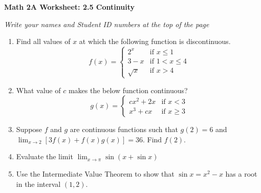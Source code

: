 \documentclass[12pt,fleqn]{article}
\begin{document}
\begin{center}
	\textbf{Math 2A Worksheet: 2.5 Continuity}
\end{center}

\emph{Write your names and Student ID numbers at the top of the page}


\begin{enumerate}
\item Find all values of $x$ at which the following function is discontinuous.
\[ f(x)=\begin{cases} 
2^x &\text{if } x\leq 1 \\
3-x &\text{if } 1< x\leq 4 \\
\sqrt{x} &\text{if } x>4 
\end{cases}
\]

\vfill

\item What value of $c$ makes the below function continuous?\\
\[ g(x)=\begin{cases} 
cx^2+2x &\text{if } x<3 \\
x^3+cx &\text{if } x\geq 3 
\end{cases}
\]

\vfill\newpage


\item Suppose $f$ and $g$ are continuous functions such that $g(2)=6$ and $\lim_{x\to2}[3f(x)+f(x)g(x)]=36$.  Find $f(2)$.

\vfill\vfill

\item Evaluate the limit
$\displaystyle \lim_{x\to\pi}\sin(x+\sin x)$


\vfill

\item Use the Intermediate Value Theorem to show that $\sin x=x^2-x$ has a root in the interval $(1,2)$.

\end{enumerate}

\vfill\vfill
\end{document}
